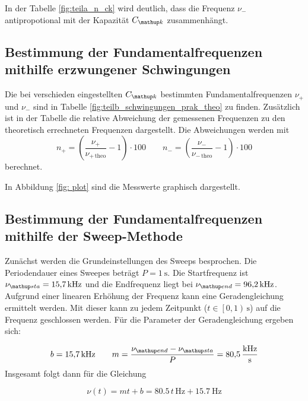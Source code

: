 %


In der Tabelle \ref{fig:teila_n_ck} wird deutlich, dass die Frequenz $\nu_-$ antipropotional
mit der Kapazität $C\ua{k}$ zusammenhängt.

\subsection{Bestimmung der Fundamentalfrequenzen mithilfe erzwungener Schwingungen}
Die bei verschieden eingestellten $C\ua{k}$ bestimmten Fundamentalfrequenzen
$\nu_+$ und $\nu_-$
sind in Tabelle \ref{fig:teilb_schwingungen_prak_theo} zu finden.
Zusätzlich ist in der Tabelle die relative Abweichung der gemessenen Frequenzen
zu den theoretisch errechneten Frequenzen dargestellt.
Die Abweichungen werden mit
\begin{equation}
\label{eq:verh}
n_+=\left(\frac{\nu_+}{\nu_{+\,\mathup{theo}}}-1\right)\cdot 100 \qquad n_-=\left(\frac{\nu_-}{\nu_{-\,\mathup{theo}}}-1\right)\cdot100
\end{equation}
berechnet.
\FloatBarrier

\FloatBarrier
In Abbildung \ref{fig: plot} sind die Messwerte graphisch dargestellt. %

\subsection{Bestimmung der Fundamentalfrequenzen mithilfe der Sweep-Methode}
Zunächst werden die Grundeinstellungen des Sweeps besprochen.
Die Periodendauer eines Sweepes beträgt $P=\SI{1}{\second}$.
Die Startfrequenz ist $\nu\ua{sta}=\SI{15.7}{\kilo\hertz}$ und die
Endfrequenz liegt bei $\nu\ua{end}=\SI{96.2}{\kilo\hertz}$.
Aufgrund einer linearen Erhöhung der Frequenz kann eine Geradengleichung ermittelt werden.
Mit dieser kann zu jedem Zeitpunkt ($t\in\left[0,1\right)\,\si{\second}$) auf die Frequenz geschlossen werden.
Für die Parameter der Geradengleichung ergeben sich:

\begin{equation*}
b=\SI{15.7}{\kilo\hertz} \qquad m=\frac{\nu\ua{end}-\nu\ua{sta}}{P}=\SI{80.5}{\kilo\hertz\per\second}
\end{equation*}
Insgesamt folgt dann für die Gleichung %

\begin{equation}
\label{eq:geraden}
\nu(t)=mt+b=80.5\,t\,\si{\hertz}+\SI{15.7}{\hertz}
\end{equation}

